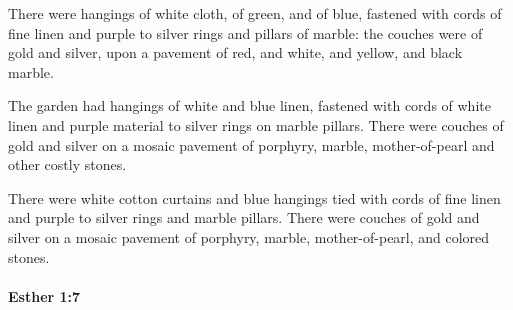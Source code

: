 			\begin{versebox}
					\item[BHS] 
					\item[LXX] 
					\item[ASV] There were hangings of white cloth, of green, and of blue, fastened with cords of fine linen and purple to silver rings and pillars of marble: the couches were of gold and silver, upon a pavement of red, and white, and yellow, and black marble.
					\item[NIV] The garden had hangings of white and blue linen, fastened with cords of white linen and purple material to silver rings on marble pillars. There were couches of gold and silver on a mosaic pavement of porphyry, marble, mother-of-pearl and other costly stones.
					\item[NRSV] There were white cotton curtains and blue hangings tied with cords of fine linen and purple to silver rings and marble pillars. There were couches of gold and silver on a mosaic pavement of porphyry, marble, mother-of-pearl, and colored stones.
			\end{versebox}

		\paragraph{Esther 1:7} %
			\label{ESTHER-1-7}

